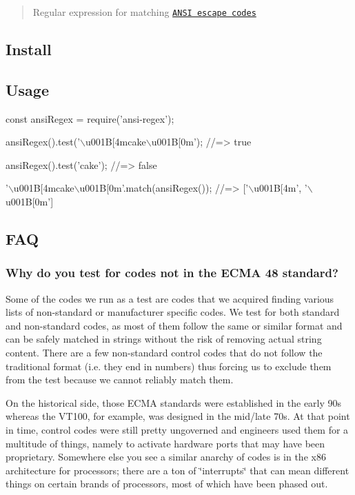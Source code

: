 \begin{quote}
Regular expression for matching \href{https://en.wikipedia.org/wiki/ANSI_escape_code}{\tt A\+N\+SI escape codes} \end{quote}


\subsection*{Install}




\subsection*{Usage}


\begin{DoxyCode}
const ansiRegex = require('ansi-regex');

ansiRegex().test('\(\backslash\)u001B[4mcake\(\backslash\)u001B[0m');
//=> true

ansiRegex().test('cake');
//=> false

'\(\backslash\)u001B[4mcake\(\backslash\)u001B[0m'.match(ansiRegex());
//=> ['\(\backslash\)u001B[4m', '\(\backslash\)u001B[0m']
\end{DoxyCode}


\subsection*{F\+AQ}

\subsubsection*{Why do you test for codes not in the E\+C\+MA 48 standard?}

Some of the codes we run as a test are codes that we acquired finding various lists of non-\/standard or manufacturer specific codes. We test for both standard and non-\/standard codes, as most of them follow the same or similar format and can be safely matched in strings without the risk of removing actual string content. There are a few non-\/standard control codes that do not follow the traditional format (i.\+e. they end in numbers) thus forcing us to exclude them from the test because we cannot reliably match them.

On the historical side, those E\+C\+MA standards were established in the early 90\textquotesingle{}s whereas the V\+T100, for example, was designed in the mid/late 70\textquotesingle{}s. At that point in time, control codes were still pretty ungoverned and engineers used them for a multitude of things, namely to activate hardware ports that may have been proprietary. Somewhere else you see a similar \textquotesingle{}anarchy\textquotesingle{} of codes is in the x86 architecture for processors; there are a ton of \char`\"{}interrupts\char`\"{} that can mean different things on certain brands of processors, most of which have been phased out.

